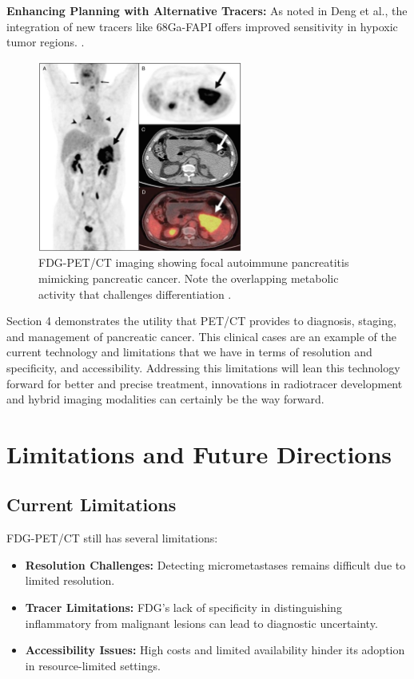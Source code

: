 \documentclass[11pt]{article} %
\begin{document}
\textbf{Enhancing Planning with Alternative Tracers:} As noted in Deng et al., the integration of new tracers like 68Ga-FAPI offers improved sensitivity in hypoxic tumor regions. \cite{Deng2021}.

\begin{figure}[H]
    \centering
    \includegraphics[width=0.6\textwidth]{assets/Zheng1.png}
    \caption{FDG-PET/CT imaging showing focal autoimmune pancreatitis mimicking pancreatic cancer. Note the overlapping metabolic activity that challenges differentiation \cite{Zheng2018}.}
    \label{fig:Zheng1}
\end{figure}


Section 4 demonstrates the utility that PET/CT provides to diagnosis, staging, and management of pancreatic cancer. This clinical cases are an example of the current technology and limitations that we have in terms of resolution and specificity, and accessibility. Addressing this limitations will lean this technology forward for better and precise treatment, innovations in radiotracer development and hybrid imaging modalities can certainly be the way forward.

\section{Limitations and Future Directions}

\subsection{Current Limitations}

FDG-PET/CT still has several limitations:
\begin{itemize}
    \item \textbf{Resolution Challenges:} Detecting micrometastases remains difficult due to limited resolution.
    \item \textbf{Tracer Limitations:} FDG’s lack of specificity in distinguishing inflammatory from malignant lesions can lead to diagnostic uncertainty.
    \item \textbf{Accessibility Issues:} High costs and limited availability hinder its adoption in resource-limited settings.
\end{itemize}
\end{document}
